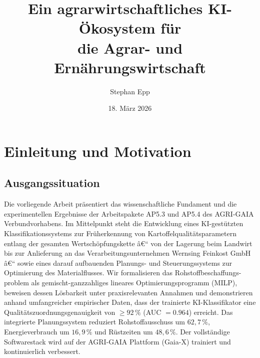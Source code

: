 ﻿\documentclass[12pt,a4paper]{article}
\title{Ein agrarwirtschaftliches KI-Ökosystem für\\
	die Agrar- und Ernährungswirtschaft}
\author{Stephan Epp}
\date{18. März 2026}
\theoremstyle{plain}
\theoremstyle{definition}
\begin{document}

	\maketitle
	
	\tableofcontents
	\newpage
		
	\section{Einleitung und Motivation}
	
	\subsection{Ausgangssituation}
	Die vorliegende Arbeit präsentiert das wissenschaftliche Fundament und die
	experimentellen Ergebnisse der Arbeitspakete AP5.3 und AP5.4 des AGRI-GAIA
	Verbundvorhabens. Im Mittelpunkt steht die Entwicklung eines KI-gestützten
	Klassifikationssystems zur Früherkennung von Kartoffelqualitätsparametern
	entlang der gesamten Wertschöpfungskette â€“ von der Lagerung beim Landwirt
	bis zur Anlieferung an das Verarbeitungsunternehmen Wernsing Feinkost GmbH
	â€“ sowie eines darauf aufbauenden Planungs- und Steuerungssystems zur
	Optimierung des Materialflusses. Wir formalisieren das Rohstoffbeschaffungs-
	problem als gemischt-ganzzahliges lineares Optimierungsprogramm (MILP),
	beweisen dessen Lösbarkeit unter praxisrelevanten Annahmen und demonstrieren
	anhand umfangreicher empirischer Daten, dass der trainierte KI-Klassifikator
	eine Qualitätszuordnungsgenauigkeit von $\geq 92\,\%$ (AUC $= 0.964$)
	erreicht. Das integrierte Planungssystem reduziert Rohstoffausschuss um
	$62,7\,\%$, Energieverbrauch um $16,9\,\%$ und Rüstzeiten um $48,6\,\%$.
	Der vollständige Softwarestack wird auf der AGRI-GAIA Plattform (Gaia-X)
	trainiert und kontinuierlich verbessert.
	
\end{document}
